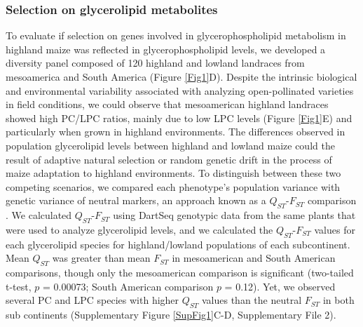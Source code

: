 \documentclass[9pt,twocolumn,twoside,lineno]{BioRxiv}
\begin{document}
\subsubsection{Selection on glycerolipid metabolites} 
To evaluate if selection on genes involved in glycerophospholipid metabolism in highland maize was reflected in glycerophospholipid levels, we developed a diversity panel composed of 120 highland and lowland landraces from mesoamerica and South America (Figure \ref{Fig1}D). 
Despite the intrinsic biological and environmental variability associated with analyzing open-pollinated varieties in field conditions, we could observe that mesoamerican highland landraces showed  high PC/LPC ratios, mainly due to low LPC levels (Figure \ref{Fig1}E) and particularly when grown in highland environments. 
The differences observed in population glycerolipid levels between highland and lowland maize could the result of adaptive natural selection or random genetic drift in the process of maize adaptation to highland environments.
To distinguish between these two competing scenarios, we compared each phenotype's population variance with genetic variance of neutral markers, an approach known as a $Q_{ST}$-$F_{ST}$ comparison \cite{Leinonen2013-ic}.
We calculated $Q_{ST}$-$F_{ST}$ using DartSeq genotypic data from the same plants that were used to analyze glycerolipid levels, and we calculated the $Q_{ST}$-$F_{ST}$ values for each glycerolipid species for highland/lowland populations of each subcontinent. 
Mean $Q_{ST}$ was greater than mean $F_{ST}$ in mesoamerican and South American comparisons, though only the mesoamerican comparison is significant (two-tailed t-test, $p$ = 0.00073; South American comparison $p$ = 0.12).
Yet, we observed several PC and LPC species with higher $Q_{ST}$ values than the neutral $F_{ST}$ in both sub continents (Supplementary Figure \ref{SupFig1}C-D, Supplementary File 2).
\end{document}
